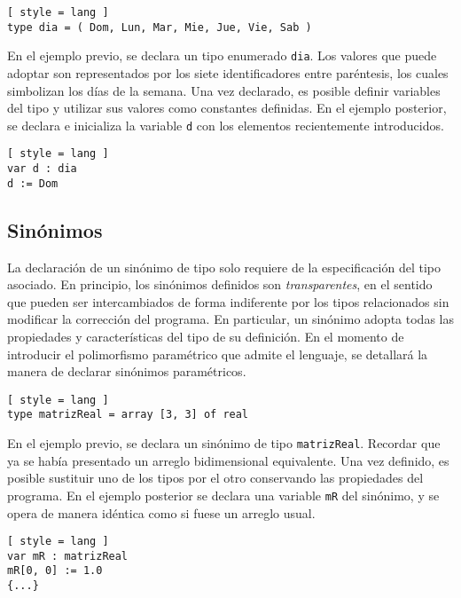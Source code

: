 \begin{lstlisting}[ style = lang ]
type dia = ( Dom, Lun, Mar, Mie, Jue, Vie, Sab )
\end{lstlisting}

En el ejemplo previo, se declara un tipo enumerado \lstinline[style = lang]{dia}.
Los valores que puede adoptar son representados por los siete identificadores entre paréntesis, los cuales simbolizan los días de la semana.
Una vez declarado, es posible definir variables del tipo y utilizar sus valores como constantes definidas.
En el ejemplo posterior, se declara e inicializa la variable \lstinline[style = lang]{d} con los elementos recientemente introducidos.

\begin{lstlisting}[ style = lang ]
var d : dia
d := Dom
\end{lstlisting}

\subsection{Sinónimos}

La declaración de un sinónimo de tipo solo requiere de la especificación del tipo asociado.
En principio, los sinónimos definidos son \textit{transparentes}, en el sentido que pueden ser intercambiados de forma indiferente por los tipos relacionados sin modificar la corrección del programa.
En particular, un sinónimo adopta todas las propiedades y características del tipo de su definición.
En el momento de introducir el polimorfismo paramétrico que admite el lenguaje, se detallará la manera de declarar sinónimos paramétricos.

\begin{lstlisting}[ style = lang ]
type matrizReal = array [3, 3] of real
\end{lstlisting}

En el ejemplo previo, se declara un sinónimo de tipo \lstinline[style = lang]{matrizReal}.
Recordar que ya se había presentado un arreglo bidimensional equivalente.
Una vez definido, es posible sustituir uno de los tipos por el otro conservando las propiedades del programa.
En el ejemplo posterior se declara una variable \lstinline[style = lang]{mR} del sinónimo, y se opera de manera idéntica como si fuese un arreglo usual.

\begin{lstlisting}[ style = lang ]
var mR : matrizReal
mR[0, 0] := 1.0
{...}
\end{lstlisting}


